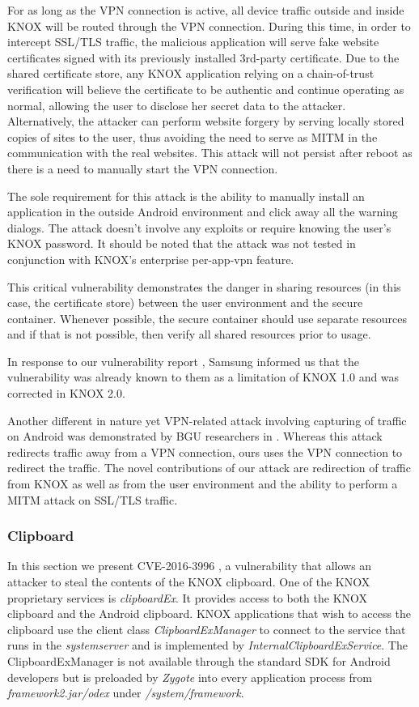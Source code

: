 \documentclass[11pt]{article}
\begin{document}
For as long as the VPN connection is active, all device traffic outside and inside KNOX will be routed through the VPN connection.
During this time, in order to intercept SSL/TLS traffic, the malicious application will serve fake website certificates signed with its previously installed 3rd-party certificate.
Due to the shared certificate store, any KNOX application relying on a chain-of-trust verification will believe the certificate to be authentic and
continue operating as normal, allowing the user to disclose her secret data to the attacker. 
Alternatively, the attacker can perform website forgery by serving locally stored copies of sites to the user, thus avoiding the need to serve as MITM
in the communication with the real websites.
This attack will not persist after reboot as there is a need to manually start the VPN connection.

The sole requirement for this attack is the ability to manually install an application in the outside Android environment and click away all the warning 
dialogs. The attack doesn't involve any exploits or require knowing the user's KNOX password. 
It should be noted that the attack was not tested in conjunction with KNOX's enterprise per-app-vpn feature. 

This critical vulnerability demonstrates the danger in sharing resources (in this case, the certificate store) between the user environment and the secure container. 
Whenever possible, the secure container should use separate resources and if that is not possible, then verify all shared resources prior to usage.

In response to our vulnerability report \cite{SamsungCorrespondence}, Samsung informed us that the vulnerability was already known to them as a limitation of KNOX 1.0 
and was corrected in KNOX 2.0. 

Another different in nature yet VPN-related attack involving capturing of traffic on Android was demonstrated by BGU researchers in \cite{BGUVpnRelatedAttack}. 
Whereas this attack redirects traffic away from a VPN connection, ours uses the VPN connection to redirect the traffic. 
The novel contributions of our attack are redirection of traffic from KNOX as well as from the user environment and the ability to 
perform a MITM attack on SSL/TLS traffic.

\subsubsection{Clipboard} \label{knox-1.0-attacks-clipboard}
In this section we present CVE-2016-3996 \cite{CVE-2016-3996}, a vulnerability that allows an attacker to steal the contents of the KNOX clipboard.
One of the KNOX proprietary services is \emph{clipboardEx}. It provides access to both the KNOX clipboard and the Android clipboard.
KNOX applications that wish to access the clipboard use the client class \emph{ClipboardExManager} to connect to the 
service that runs in the \emph{system\textunderscore server} and is implemented by \emph{InternalClipboardExService}.
The ClipboardExManager is not available through the standard SDK for Android developers but is preloaded by \emph{Zygote} into every application process 
from \emph{framework2.jar/odex} under \emph{/system/framework}.
\end{document}
